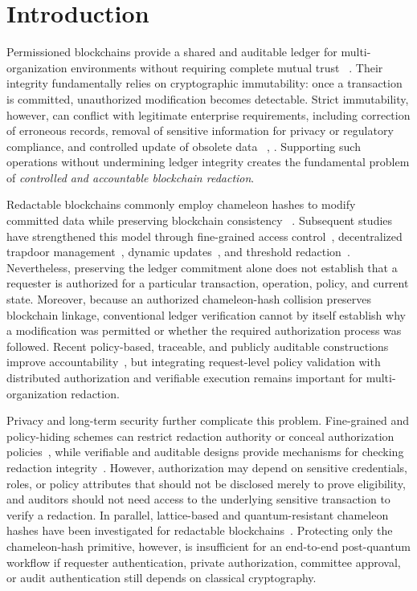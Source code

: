 \documentclass[lettersize,journal]{IEEEtran}
\begin{document}
    \section{Introduction}
    
    Permissioned blockchains provide a shared and auditable ledger for
    multi-organization environments without requiring complete mutual
    trust {~\cite{ref7}}. Their integrity fundamentally relies on cryptographic
    immutability: once a transaction is committed, unauthorized
    modification becomes detectable. Strict immutability, however, can
    conflict with legitimate enterprise requirements, including correction
    of erroneous records, removal of sensitive information for privacy or
    regulatory compliance, and controlled update of obsolete
    data~\cite{ref9,ref21,ref22} {, \cite{ref38}}. Supporting such operations without
    undermining ledger integrity creates the fundamental problem of
    \emph{controlled and accountable blockchain redaction}.
    
    Redactable blockchains commonly employ chameleon hashes to modify
    committed data while preserving blockchain consistency
    ~\cite{ref1,ref2,ref6,ref30}. Subsequent studies have strengthened this
    model through fine-grained access control~\cite{ref8,ref15},
    decentralized trapdoor management~\cite{ref3,ref19}, dynamic
    updates~\cite{ref5,ref16}, and threshold redaction~\cite{ref27}.
    Nevertheless, preserving the ledger commitment alone does not establish
    that a requester is authorized for a particular transaction, operation,
    policy, and current state. Moreover, because an authorized
    chameleon-hash collision preserves blockchain linkage, conventional
    ledger verification cannot by itself establish why a modification was
    permitted or whether the required authorization process was followed.
    Recent policy-based, traceable, and publicly auditable constructions
    improve accountability~\cite{ref33,ref34,ref35}, but integrating
    request-level policy validation with distributed authorization and
    verifiable execution remains important for multi-organization
    redaction.
    
    Privacy and long-term security further complicate this problem.
    Fine-grained and policy-hiding schemes can restrict redaction authority
    or conceal authorization policies~\cite{ref4,ref18,ref31,ref34}, while
    verifiable and auditable designs provide mechanisms for checking
    redaction integrity~\cite{ref13,ref20,ref33}. However, authorization
    may depend on sensitive credentials, roles, or policy attributes that
    should not be disclosed merely to prove eligibility, and auditors
    should not need access to the underlying sensitive transaction to
    verify a redaction. In parallel, lattice-based and quantum-resistant
    chameleon hashes have been investigated for redactable
    blockchains~\cite{ref10,ref11,ref17,ref37}. Protecting only the
    chameleon-hash primitive, however, is insufficient for an end-to-end
    post-quantum workflow if requester authentication, private
    authorization, committee approval, or audit authentication still
    depends on classical cryptography.
    
\end{document}
